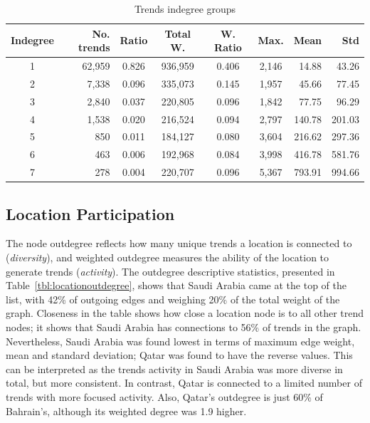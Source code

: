 \documentclass{llncs}
\begin{document}
\begin{table}[!h]
\centering
\caption{Trends indegree groups}
\begin{tabular}{@{}crccccrr@{}}
\toprule
Indegree & No. trends & Ratio & Total W. & W. Ratio & Max. & Mean & Std \\ 
\midrule
1 & 62,959 & 0.826 & 936,959 & 0.406 & 2,146 &   14.88 &   43.26\\
2 &   7,338 & 0.096 & 335,073 & 0.145 & 1,957 &   45.66 &   77.45\\
3 &   2,840 & 0.037 & 220,805 & 0.096 & 1,842 &   77.75 &   96.29\\
4 &   1,538 & 0.020 & 216,524 & 0.094 & 2,797 & 140.78 & 201.03\\
5 &      850 & 0.011 & 184,127 & 0.080 & 3,604 & 216.62 & 297.36\\
6 &      463 & 0.006 & 192,968 & 0.084 & 3,998 & 416.78 & 581.76\\
7 &      278 & 0.004 & 220,707 & 0.096 & 5,367 & 793.91 & 994.66\\
\bottomrule
\end{tabular}
\label{tbl:trendsindegree}
\end{table}

\subsection{Location Participation}

The node outdegree reflects how many unique trends a location is
connected to ({\emph{diversity}}), and weighted outdegree measures the
ability of the location to generate trends ({\emph{activity}}). The
outdegree descriptive statistics, presented in
Table~\ref{tbl:locationoutdegree}, shows that Saudi Arabia came at the
top of the list, with 42\% of outgoing edges and weighing 20\% of the
total weight of the graph. Closeness in the table shows how close a
location node is to all other trend nodes; it shows that Saudi Arabia
has connections to 56\% of trends in the graph. Nevertheless, Saudi
Arabia was found lowest in terms of maximum edge weight, mean and
standard deviation; Qatar was found to have the reverse values. This
can be interpreted as the trends activity in Saudi Arabia was more
diverse in total, but more consistent. In contrast, Qatar is connected
to a limited number of trends with more focused activity. Also,
Qatar's outdegree is just 60\% of Bahrain's, although its weighted
degree was 1.9 higher.
\end{document}
